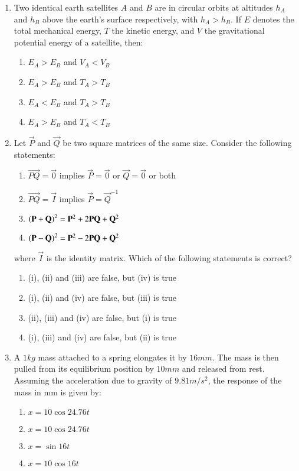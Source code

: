 \documentclass[journal]{IEEEtran}
\begin{document}
\begin{enumerate}
    \item Two identical earth satellites $A$ and $B$ are in circular orbits at altitudes $h_A$
    and $h_B$ above the earth's surface respectively, with $h_A > h_B$. If $E$ denotes the total
    mechanical energy, $T$ the kinetic energy, and $V$ the gravitational potential energy of a
    satellite, then:
    \begin{multicols}{2}
        \begin{enumerate}
            \item $E_A > E_B$ and $V_A < V_B$
            \item $E_A > E_B$ and $T_A > T_B$
            \item $E_A < E_B$ and $T_A > T_B$
            \item $E_A > E_B$ and $T_A < T_B$
        \end{enumerate}
    \end{multicols}

    \item Let $\vec{P}$ and $\vec{Q}$ be two square matrices of the same size. Consider the following statements:
    \begin{enumerate}[label=(\roman*)]
        \item $\vec{PQ} = \vec{0}$ implies $\vec{P} = \vec{0}$ or $\vec{Q} = \vec{0}$ or both
        \item $\vec{PQ} = \vec{I}$ implies $\vec{P} = \vec{Q}^{-1}$
        \item $\left(\mathbf{P} + \mathbf{Q}\right)^2 = \mathbf{P}^2 + 2\mathbf{PQ} + \mathbf{Q}^2$
        \item $\left(\mathbf{P} - \mathbf{Q}\right)^2 = \mathbf{P}^2 - 2\mathbf{PQ} + \mathbf{Q}^2$
    \end{enumerate}
    where $\vec{I}$ is the identity matrix. Which of the following statements is correct?
    \begin{enumerate}
        \item (i), (ii) and (iii) are false, but (iv) is true
        \item (i), (ii) and (iv) are false, but (iii) is true
        \item (ii), (iii) and (iv) are false, but (i) is true
        \item (i), (iii) and (iv) are false, but (ii) is true
    \end{enumerate}

    \item A $1 kg$ mass attached to a spring elongates it by $16 mm$. The mass is then pulled from its
    equilibrium position by $10 mm$ and released from rest. Assuming the acceleration due to gravity
    of $9.81 m/s^2$, the response of the mass in mm is given by:
    \begin{multicols}{2}
        \begin{enumerate}
            \item $x = 10 \cos 24.76t$
            \item $x = 10 \cos 24.76t$
            \item $x = \sin 16t$
            \item $x = 10 \cos 16t$
        \end{enumerate}
    \end{multicols}


\end{enumerate}
\end{document}
